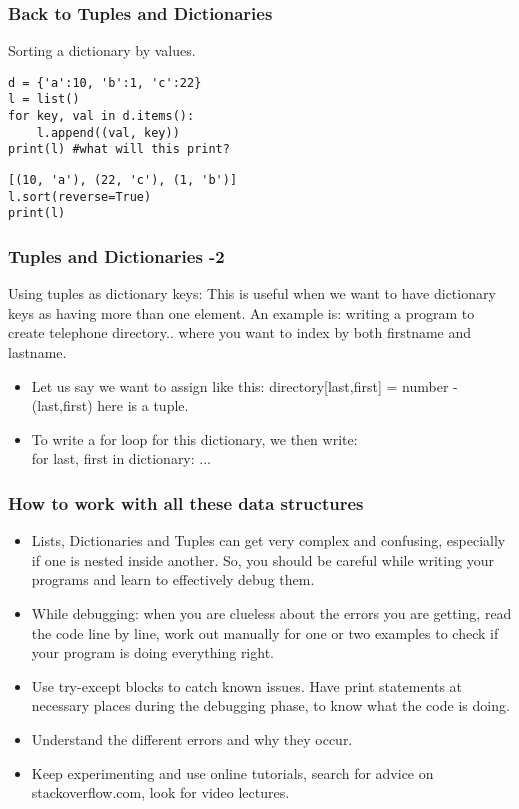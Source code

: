 \documentclass{beamer}
\begin{document}
\begin{frame}[fragile] %
\frametitle{Back to Tuples and Dictionaries}
Sorting a dictionary by values.
\begin{verbatim}
d = {'a':10, 'b':1, 'c':22}
l = list()
for key, val in d.items():
    l.append((val, key))
print(l) #what will this print?
\end{verbatim} \pause
\begin{verbatim}
[(10, 'a'), (22, 'c'), (1, 'b')]
l.sort(reverse=True)
print(l)
\end{verbatim}
\end{frame}

\begin{frame}[fragile]
\frametitle{Tuples and Dictionaries -2}
Using tuples as dictionary keys: This is useful when we want to have dictionary keys as having more than one element. An example is: writing a program to create telephone directory.. where you want to index by both firstname and lastname. 
\begin{itemize}
\item Let us say we want to assign like this: directory[last,first] = number - (last,first) here is a tuple.
\item To write a for loop for this dictionary, we then write: \\ for last, first in dictionary: ...
\end{itemize}
\end{frame}

\begin{frame} %
\frametitle{How to work with all these data structures}
\begin{itemize}
\item Lists, Dictionaries and Tuples can get very complex and confusing, especially if one is nested inside another. So, you should be careful while writing your programs and learn to effectively debug them. \pause
\item While debugging: when you are clueless about the errors you are getting, read the code line by line, work out manually for one or two examples to check if your program is doing everything right. \pause
\item Use try-except blocks to catch known issues. Have print statements at necessary places during the debugging phase, to know what the code is doing.\pause
\item Understand the different errors and why they occur. \pause
\item Keep experimenting and use online tutorials, search for advice on stackoverflow.com, look for video lectures.
\end{itemize}
\end{frame}
\end{document}
